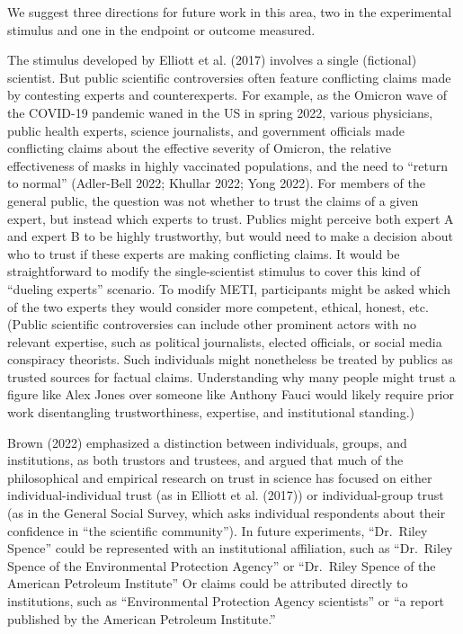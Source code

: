 \documentclass[
  letterpaper,
  DIV=11,
  numbers=noendperiod]{scrartcl}
\begin{document}
We suggest three directions for future work in this area, two in the
experimental stimulus and one in the endpoint or outcome measured.

The stimulus developed by Elliott et al. (2017) involves a single
(fictional) scientist. But public scientific controversies often feature
conflicting claims made by contesting experts and counterexperts. For
example, as the Omicron wave of the COVID-19 pandemic waned in the US in
spring 2022, various physicians, public health experts, science
journalists, and government officials made conflicting claims about the
effective severity of Omicron, the relative effectiveness of masks in
highly vaccinated populations, and the need to ``return to normal''
(Adler-Bell 2022; Khullar 2022; Yong 2022). For members of the general
public, the question was not whether to trust the claims of a given
expert, but instead which experts to trust. Publics might perceive both
expert A and expert B to be highly trustworthy, but would need to make a
decision about who to trust if these experts are making conflicting
claims. It would be straightforward to modify the single-scientist
stimulus to cover this kind of ``dueling experts'' scenario. To modify
METI, participants might be asked which of the two experts they would
consider more competent, ethical, honest, etc. (Public scientific
controversies can include other prominent actors with no relevant
expertise, such as political journalists, elected officials, or social
media conspiracy theorists. Such individuals might nonetheless be
treated by publics as trusted sources for factual claims. Understanding
why many people might trust a figure like Alex Jones over someone like
Anthony Fauci would likely require prior work disentangling
trustworthiness, expertise, and institutional standing.)

Brown (2022) emphasized a distinction between individuals, groups, and
institutions, as both trustors and trustees, and argued that much of the
philosophical and empirical research on trust in science has focused on
either individual-individual trust (as in Elliott et al. (2017)) or
individual-group trust (as in the General Social Survey, which asks
individual respondents about their confidence in ``the scientific
community''). In future experiments, ``Dr.~Riley Spence'' could be
represented with an institutional affiliation, such as ``Dr.~Riley
Spence of the Environmental Protection Agency'' or ``Dr.~Riley Spence of
the American Petroleum Institute'' Or claims could be attributed
directly to institutions, such as ``Environmental Protection Agency
scientists'' or ``a report published by the American Petroleum
Institute.''
\end{document}
